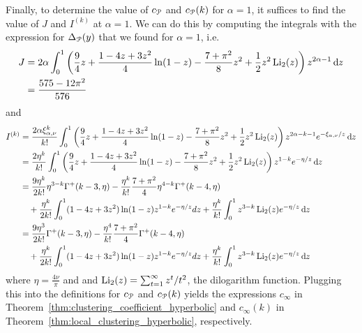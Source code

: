 Finally, to determine the value of $c_{{\mathcal P}}$ and $c_{{\mathcal P}}(k)$ for $\alpha=1$, it suffices to find the value of $J$ and $I^{(k)}$ at $\alpha = 1$. We can do this by computing the integrals with the expression for $\Delta_{{\mathcal P}}(y)$ that we found for $\alpha=1$, i.e.
\begin{align*}
	J &= 2\alpha\int_0^1 \left(\frac{9}{4} z + \frac{1 - 4 z + 3 z^2}{4}\ln(1 - z) - \frac{7+\pi^2}{8}
		z^2  + \frac{1}{2}z^2 \operatorname{Li}_2(z)\right) z^{2\alpha -1} \operatorname{\mathrm{d}\hspace{-2pt}} z \\
	&=\frac{575-12\pi^2}{576}
\end{align*}
and 
\begin{align*}
	I^{(k)} &= \frac{2\alpha \xi_{\alpha,\nu}^k}{k!}\int_0^1 \left(\frac{9}{4} z + \frac{1 - 4 z + 3 z^2}{4}\ln(1 - z) 
		- \frac{7+\pi^2}{8}	z^2  + \frac{1}{2}z^2 \operatorname{Li}_2(z) \right)z^{2\alpha-k-1} e^{-\xi_{\alpha,\nu}/z} \operatorname{\mathrm{d}\hspace{-2pt}} z \\
	&= \frac{2 \eta^k}{k!}\int_0^1 \left(\frac{9}{4} z + \frac{1 - 4 z + 3 z^2}{4}\ln(1 - z) 
		- \frac{7+\pi^2}{8} z^2  + \frac{1}{2}z^2 \operatorname{Li}_2(z) \right)z^{1-k} e^{-\eta/z} \operatorname{\mathrm{d}\hspace{-2pt}} z \\
	&= \frac{9 \eta^k}{2 k!}\eta^{3-k}\Gamma^+(k-3,\eta)-\frac{\eta^k}{k!}\frac{7+\pi^2}{4}\eta^{4-k}\Gamma^+(k-4,\eta)\\
	&\hspace{10pt}+ \frac{\eta^k}{2k!}\int_0^1 (1-4z+3z^2)\ln(1-z)z^{1-k}e^{-\eta/z}dz+\frac{\eta^k}{k!}\int_0^1 z^{3-k} 
		\operatorname{Li}_2(z) e^{-\eta/z} \operatorname{\mathrm{d}\hspace{-2pt}} z \\
	&=\frac{9 \eta^3}{2 k!}\Gamma^+(k-3,\eta)-\frac{\eta^4}{k!}\frac{7+\pi^2}{4}\Gamma^+(k-4,\eta)\\
	&\hspace{10pt}+ \frac{\eta^k}{2k!}\int_0^1 (1-4z+3z^2)\ln(1-z)z^{1-k}e^{-\eta/z}dz+\frac{\eta^k}{k!}\int_0^1 z^{3-k} 
		\operatorname{Li}_2(z) e^{-\eta/z} \operatorname{\mathrm{d}\hspace{-2pt}} z
\end{align*}
where $\eta = \frac{4\nu}{\pi}$ and and $\operatorname{Li}_2(z) = \sum_{t = 1}^\infty z^t/t^2$, the dilogarithm function. Plugging this into the definitions for $c_{{\mathcal P}}$ and $c_{{\mathcal P}}(k)$ yields the expressions $c_\infty$ in Theorem~\ref{thm:clustering_coefficient_hyperbolic} and $c_{\infty}(k)$ in Theorem~\ref{thm:local_clustering_hyperbolic}, respectively.

